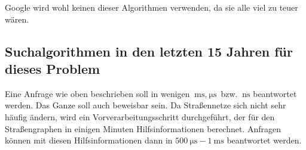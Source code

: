 \documentclass{scrartcl}%
\begin{document}
    Google wird wohl keinen dieser Algorithmen verwenden, da sie alle viel zu teuer wären.

    \subsection*{Suchalgorithmen in den letzten 15 Jahren für dieses Problem}
    Eine Anfrage wie oben beschrieben soll in wenigen $\SI{}{\ms}, \SI{}{\micro\s}$ bzw. $\SI{}{\ns}$ beantwortet werden.
    Das Ganze soll auch beweisbar sein.
    Da Straßennetze sich nicht sehr häufig ändern, wird ein Vorverarbeitungsschritt durchgeführt,
    der für den Straßengraphen in einigen Minuten Hilfsinformationen berechnet.
    Anfragen können mit diesen Hilfsinformationen dann in $\SI{500}{\micro\s} - \SI{1}{\ms}$ beantwortet werden.
\end{document}
